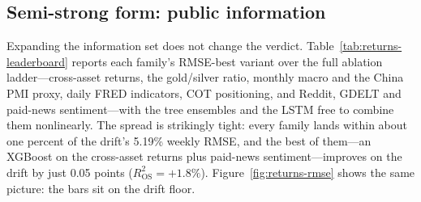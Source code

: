 \documentclass[12pt, a4paper]{article}
\begin{document}
\subsection{Semi-strong form: public information}

Expanding the information set does not change the verdict. Table~\ref{tab:returns-leaderboard}
reports each family's RMSE-best variant over the full ablation ladder---cross-asset returns,
the gold/silver ratio, monthly macro and the China PMI proxy, daily FRED indicators, COT
positioning, and Reddit, GDELT and paid-news sentiment---with the tree ensembles and the LSTM
free to combine them nonlinearly. The spread is strikingly tight: every family lands within
about one percent of the drift's 5.19\% weekly RMSE, and the best of them---an
XGBoost on the cross-asset returns plus paid-news sentiment---improves on the drift by just
0.05 points (\(R^2_{\text{OS}}=+1.8\%\)). Figure~\ref{fig:returns-rmse} shows the same picture:
the bars sit on the drift floor.
\end{document}
